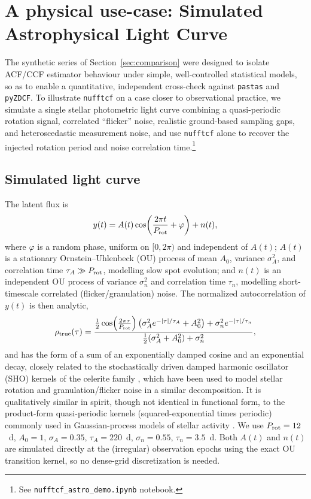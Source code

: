 \documentclass[twocolumn,10pt]{article}
\newcommand{\nufftcf}{\texttt{nufftcf}\xspace}
\newcommand{\pastas}{\texttt{pastas}\xspace}
\newcommand{\pyzdcf}{\texttt{pyZDCF}\xspace}
\begin{document}
\section{A physical use-case: Simulated Astrophysical Light Curve}
\label{sec:astro_example}
The synthetic series of Section~\ref{sec:comparison} were designed to
isolate ACF/CCF estimator behaviour under simple, well-controlled
statistical models, so as to enable a quantitative, independent
cross-check against \pastas and \pyzdcf. To illustrate \nufftcf on a
case closer to observational practice, we simulate a single stellar
photometric light curve combining a quasi-periodic rotation signal,
correlated ``flicker'' noise, realistic ground-based sampling gaps,
and heteroscedastic measurement noise, and use \nufftcf alone to recover the injected
rotation period and noise correlation time.\footnote{See
\texttt{nufftcf\_astro\_demo.ipynb} notebook.}
%
\subsection{Simulated light curve}
\label{sec:astro_model}
%
The latent flux is
\begin{equation}
y(t) = A(t)\cos\!\left(\frac{2\pi t}{P_{\rm rot}}+\varphi\right) + n(t),
\label{eq:astro_model}
\end{equation}
where $\varphi$ is a random phase, uniform on $[0,2\pi)$ and
independent of $A(t)$; $A(t)$ is a stationary Ornstein--Uhlenbeck (OU)
process of mean $A_0$, variance $\sigma_A^2$, and correlation time
$\tau_A \gg P_{\rm rot}$, modelling slow spot evolution; and $n(t)$ is
an independent OU process of variance $\sigma_n^2$ and correlation
time $\tau_n$, modelling short-timescale correlated (flicker/granulation)
noise. The normalized autocorrelation of $y(t)$ is then analytic,
\begin{equation}
\rho_{\rm true}(\tau) = \frac{\tfrac12\cos\!\left(\frac{2\pi\tau}{P_{\rm rot}}\right)\left(\sigma_A^2 e^{-|\tau|/\tau_A}+A_0^2\right) + \sigma_n^2 e^{-|\tau|/\tau_n}}{\tfrac12(\sigma_A^2+A_0^2)+\sigma_n^2},
\label{eq:astro_acf_true}
\end{equation}
and has the form of a sum of an exponentially damped cosine and an exponential decay, closely related to the stochastically driven damped harmonic oscillator (SHO) kernels of the celerite family \citep{ForemanMackey2017}, which have been used to model stellar rotation \citep[e.g.][]{Angus2018} and granulation/flicker noise in a similar decomposition. It is qualitatively similar in spirit, though not identical in functional form, to the product-form quasi-periodic kernels (squared-exponential times periodic) commonly used in  Gaussian-process models of stellar activity \citep[e.g.][]{Rajpaul2015}. We use $P_{\rm rot}=12$~d, $A_0=1$, $\sigma_A=0.35$,
$\tau_A=220$~d, $\sigma_n=0.55$, $\tau_n=3.5$~d. Both $A(t)$ and $n(t)$
are simulated directly at the (irregular) observation epochs using the
exact OU transition kernel, so no dense-grid discretization is needed.
\end{document}
